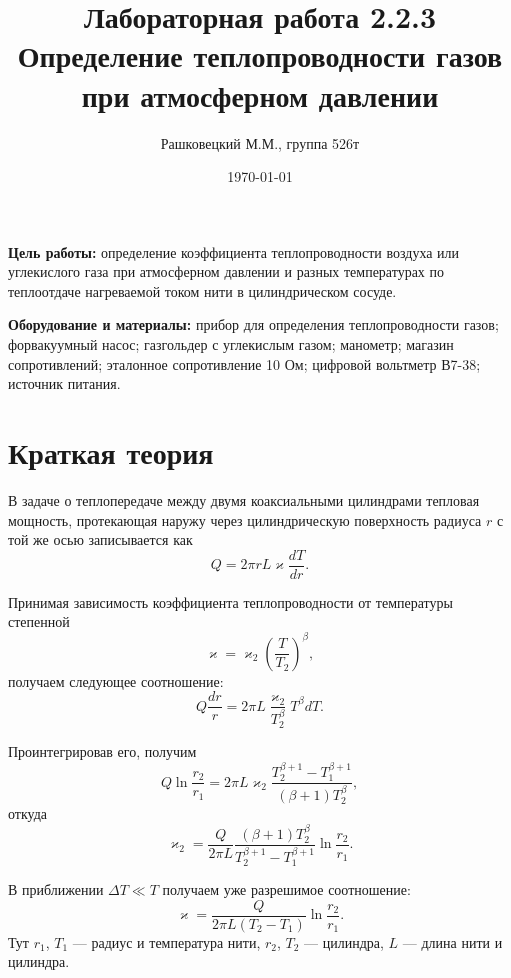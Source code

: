 \documentclass[12pt]{article}
\author{Рашковецкий М.М., группа 526т}
\date{\today}
\title{Лабораторная работа 2.2.3\\Определение теплопроводности газов при атмосферном давлении}
\begin{document}
	\maketitle
	
	{\parindent=1cm \hangindent=1cm \parskip=0.5cm
	{\bfseries Цель работы:} определение коэффициента теплопроводности воздуха или углекислого газа при атмосферном давлении и разных температурах по теплоотдаче нагреваемой током нити в цилиндрическом сосуде.
	
	\hangindent=1cm
	{\bfseries Оборудование и материалы:} прибор для определения теплопроводности газов; форвакуумный насос; газгольдер с углекислым газом; манометр; магазин сопротивлений; эталонное сопротивление 10 Ом; цифровой вольтметр В7-38; источник питания.\par}
	\section*{Краткая теория}
	
	\indent В задаче о теплопередаче между двумя коаксиальными цилиндрами тепловая мощность, протекающая наружу через цилиндрическую поверхность радиуса $r$ с той же осью записывается как
	\begin{equation}
		\label{eq:heat_stream}
		Q=2\pi r L \varkappa \frac{dT}{dr}.
	\end{equation}
	
	Принимая зависимость коэффициента теплопроводности от температуры степенной
	\begin{equation}
		\label{eq:k_heat_pow}
		\varkappa=\varkappa_2 \left( \frac{T}{T_2} \right) ^\beta,
	\end{equation}
	получаем следующее соотношение:
	\begin{equation}
		\label{eq:k_heat_diff}
		Q \frac{dr}{r} = 2\pi L \frac{\varkappa_2}{T_2^\beta} T^\beta dT.
	\end{equation}
	
	Проинтегрировав его, получим
	\begin{equation}
		\label{eq:k_heat_int}
		Q \ln \frac{r_2}{r_1} = 2\pi L \varkappa_2 \frac{T_2^{\beta+1}-T_1^{\beta+1}}{(\beta+1) T_2^\beta},
	\end{equation}
	откуда
	\begin{equation}
		\label{eq:k_heat_final_accurate}
		\varkappa_2 = \frac{Q}{2\pi L} \frac{(\beta+1) T_2^\beta}{T_2^{\beta+1}-T_1^{\beta+1}} \ln \frac{r_2}{r_1}.
	\end{equation}
	
	В приближении $\Delta T \ll T$ получаем уже разрешимое соотношение:
	\begin{equation}
		\label{eq:k_heat_final}
		\varkappa = \frac{Q}{2\pi L \left( T_2-T_1 \right)} \ln \frac{r_2}{r_1}.
	\end{equation}
	Тут $r_1$, $T_1$ --- радиус и температура нити, $r_2$, $T_2$ --- цилиндра, $L$ --- длина нити и цилиндра.
	
\end{document}
